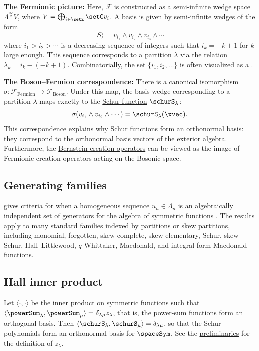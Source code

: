 \textbf{The Fermionic picture:} Here, $\mathcal{F}$ is constructed as a
semi-infinite wedge space $\Lambda^{\frac{\infty}{2}} V$, where
$V = \bigoplus_{i \in \setZ} \setC v_i$.
A basis is given by semi-infinite wedges of the form
\[
  |S\rangle = v_{i_1} \wedge v_{i_2} \wedge v_{i_3} \wedge \dotsb
\]
where $i_1 > i_2 > \dotsb$ is a decreasing sequence of integers such that
$i_k = -k+1$ for $k$ large enough.
This sequence corresponds to a partition $\lambda$ via the relation
$\lambda_k = i_k - (-k+1)$.
Combinatorially, the set $\{i_1, i_2, \dotsc \}$ is often visualized as a
.


\textbf{The Boson--Fermion correspondence:}
There is a canonical isomorphism
$\sigma: \mathcal{F}_{\text{Fermion}} \to \mathcal{F}_{\text{Boson}}$.
Under this map, the basis wedge corresponding to a partition $\lambda$ maps exactly
to the \hyperref[schurS]{Schur function} $\schurS_\lambda$:
\[
  \sigma(v_{i_1} \wedge v_{i_2} \wedge \dotsb ) = \schurS_\lambda(\xvec).
\]
This correspondence explains why Schur functions form an orthonormal basis:
they correspond to the orthonormal basis vectors of the exterior algebra.
Furthermore, the \hyperref[mapsOnSymmetricFunctions]{Bernstein creation operators}
can be viewed as the image of Fermionic creation operators acting on the Bosonic
space.


\subsection[symmetricGeneratingFamilies]{Generating families}

 gives criteria for when a homogeneous sequence
$u_n\in\Lambda_n$ is an algebraically independent set of generators for the
algebra of symmetric functions \cite{Velmurugan2024x}.  The results apply to
many standard families indexed by partitions or skew partitions, including
monomial, forgotten, skew complete, skew elementary, Schur, skew Schur,
Hall--Littlewood, $q$-Whittaker, Macdonald, and integral-form Macdonald
functions.

\subsection[hallInnerProduct]{Hall inner product}


Let $\langle \cdot, \cdot \rangle$ be the inner product on symmetric functions
such that $\langle \powerSum_\lambda, \powerSum_\mu \rangle = \delta_{\lambda\mu}z_\lambda$,
that is, the \hyperref[powerSum]{power-sum} functions form an orthogonal basis.
Then $\langle \schurS_\lambda, \schurS_\mu \rangle = \delta_{\lambda\mu}$,
so that the Schur polynomials form an orthonormal basis for $\spaceSym$.
See the \hyperref[prelimPartitionStatistics]{preliminaries} for the definition of $z_\lambda$.

